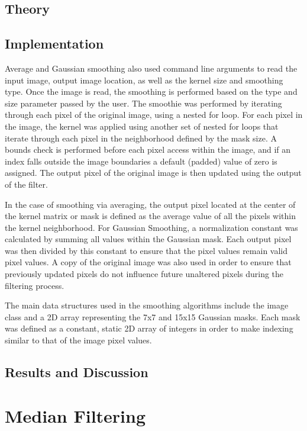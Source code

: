 \documentclass[headings=optiontoheadandtoc,listof=totoc,parskip=full]{scrartcl}
\begin{document}
\subsection{Theory}


\subsection{Implementation}

Average and Gaussian smoothing also used command line arguments to read the input image, output image location, as well as the kernel size and smoothing type. Once the image is read, the smoothing is performed based on the type and size parameter passed by the user. The smoothie was performed by iterating through each pixel of the original image, using a nested for loop. For each pixel in the image, the kernel was applied using another set of nested for loops that iterate through each pixel in the neighborhood defined by the mask size. A bounds check is performed before each pixel access within the image, and if an index falls outside the image boundaries a default (padded) value of zero is assigned. The output pixel of the original image is then updated using the output of the filter.

In the case of smoothing via averaging, the output pixel located at the center of the kernel matrix or mask is defined as the average value of all the pixels within the kernel neighborhood. For Gaussian Smoothing, a normalization constant was calculated by summing all values within the Gaussian mask. Each output pixel was then divided by this constant to ensure that the pixel values remain valid pixel values. A copy of the original image was also used in order to ensure that previously updated pixels do not influence future unaltered pixels during the filtering process.

The main data structures used in the smoothing algorithms include the image class and a 2D array representing the 7x7 and 15x15 Gaussian masks. Each mask was defined as a constant, static 2D array of integers in order to make indexing similar to that of the image pixel values.



\subsection{Results and Discussion}


\section{Median Filtering}
\label{sec:median}
\end{document}
